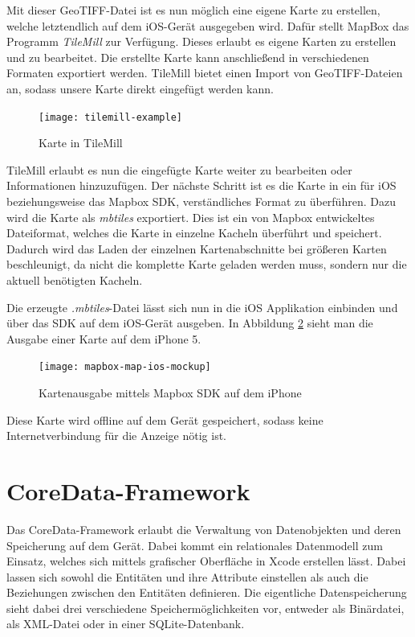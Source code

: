 Mit dieser GeoTIFF-Datei ist es nun möglich eine eigene Karte zu erstellen, welche letztendlich auf dem iOS-Gerät ausgegeben wird.
Dafür stellt MapBox das Programm \emph{TileMill} zur Verfügung. Dieses erlaubt es eigene Karten zu erstellen und zu bearbeitet. Die erstellte Karte kann anschließend in verschiedenen Formaten exportiert werden. 
TileMill bietet einen Import von GeoTIFF-Dateien an, sodass unsere Karte direkt eingefügt werden kann.

\begin{figure}[htb!]
	\centering
	\texttt{[image: tilemill-example]}
	\caption{Karte in TileMill}
	\label{tilemill-example}
\end{figure}

TileMill erlaubt es nun die eingefügte Karte weiter zu bearbeiten oder Informationen hinzuzufügen.
Der nächste Schritt ist es die Karte in ein für iOS beziehungsweise das Mapbox SDK, verständliches Format zu überführen.
Dazu wird die Karte als \emph{mbtiles} exportiert. Dies ist ein von Mapbox entwickeltes Dateiformat, welches die Karte in einzelne Kacheln überführt und speichert. Dadurch wird das Laden der einzelnen Kartenabschnitte bei größeren Karten beschleunigt, da nicht die komplette Karte geladen werden muss, sondern nur die aktuell benötigten Kacheln.

Die erzeugte \emph{.mbtiles}-Datei lässt sich nun in die iOS Applikation einbinden und über das SDK auf dem iOS-Gerät ausgeben. In Abbildung \ref{mapbox-map-ios} sieht man die Ausgabe einer Karte auf dem iPhone 5.

\begin{figure}[htb!]
		\centering
	\texttt{[image: mapbox-map-ios-mockup]}
	\caption{Kartenausgabe mittels Mapbox SDK auf dem iPhone}
	\label{mapbox-map-ios}
\end{figure}

Diese Karte wird offline auf dem Gerät gespeichert, sodass keine Internetverbindung für die Anzeige nötig ist.

\section{CoreData-Framework}
\label{sec:technologies:coredata}
Das CoreData-Framework erlaubt die Verwaltung von Datenobjekten und deren Speicherung auf dem Gerät.
Dabei kommt ein relationales Datenmodell zum Einsatz, welches sich mittels grafischer Oberfläche in Xcode erstellen lässt.
Dabei lassen sich sowohl die Entitäten und ihre Attribute einstellen als auch die Beziehungen zwischen den Entitäten definieren.
Die eigentliche Datenspeicherung sieht dabei drei verschiedene Speichermöglichkeiten vor, entweder als Binärdatei, als XML-Datei oder in einer SQLite-Datenbank. 

